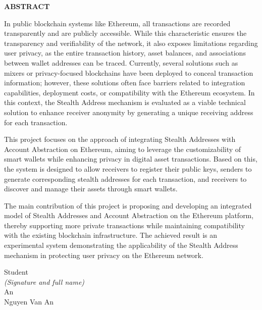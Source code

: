 \documentclass[../DoAn.tex]{subfiles}
\begin{document}
\begin{center}
    \Large{\textbf{ABSTRACT}}\\
\end{center}
\vspace{1cm}
In public blockchain systems like Ethereum, all transactions are recorded transparently and are publicly accessible. While this characteristic ensures the transparency and verifiability of the network, it also exposes limitations regarding user privacy, as the entire transaction history, asset balances, and associations between wallet addresses can be traced. Currently, several solutions such as mixers or privacy-focused blockchains have been deployed to conceal transaction information; however, these solutions often face barriers related to integration capabilities, deployment costs, or compatibility with the Ethereum ecosystem. In this context, the Stealth Address mechanism is evaluated as a viable technical solution to enhance receiver anonymity by generating a unique receiving address for each transaction.

This project focuses on the approach of integrating Stealth Addresses with Account Abstraction on Ethereum, aiming to leverage the customizability of smart wallets while enhancing privacy in digital asset transactions. Based on this, the system is designed to allow receivers to register their public keys, senders to generate corresponding stealth addresses for each transaction, and receivers to discover and manage their assets through smart wallets.

The main contribution of this project is proposing and developing an integrated model of Stealth Addresses and Account Abstraction on the Ethereum platform, thereby supporting more private transactions while maintaining compatibility with the existing blockchain infrastructure. The achieved result is an experimental system demonstrating the applicability of the Stealth Address mechanism in protecting user privacy on the Ethereum network.

\begin{flushright}
Student\\[1cm]
\textit{(Signature and full name)}\\[2cm]

An\\
Nguyen Van An
\end{flushright}
\end{document}
